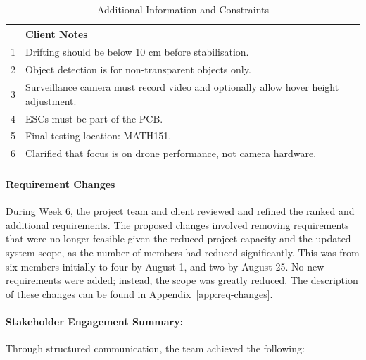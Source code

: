 \begin{table}[H]
\centering
\caption{Additional Information and Constraints}
\begin{tabular}{|p{0.5cm}|p{13cm}|}
\hline
 & \textbf{Client Notes} \\ \hline
1 & Drifting should be below 10 cm before stabilisation. \\ \hline
2 & Object detection is for non-transparent objects only. \\ \hline
3 & Surveillance camera must record video and optionally allow hover height adjustment. \\ \hline
4 & ESCs must be part of the PCB. \\ \hline
5 & Final testing location: MATH151. \\ \hline
6 & Clarified that focus is on drone performance, not camera hardware. \\ \hline
\end{tabular}
\end{table}

\paragraph{\textbf{Requirement Changes}} \leavevmode

During Week 6, the project team and client reviewed and refined the ranked and additional requirements.  The proposed changes involved removing requirements that were no longer feasible given the reduced project capacity and the updated system scope, as the number of members had reduced significantly. This was from six members initially to four by August 1, and two by August 25. No new requirements were added; instead, the scope was greatly reduced. The description of these changes can be found in Appendix~\ref{app:req-changes}.

\paragraph{\textbf{Stakeholder Engagement Summary:}} \leavevmode

Through structured communication, the team achieved the following: \

